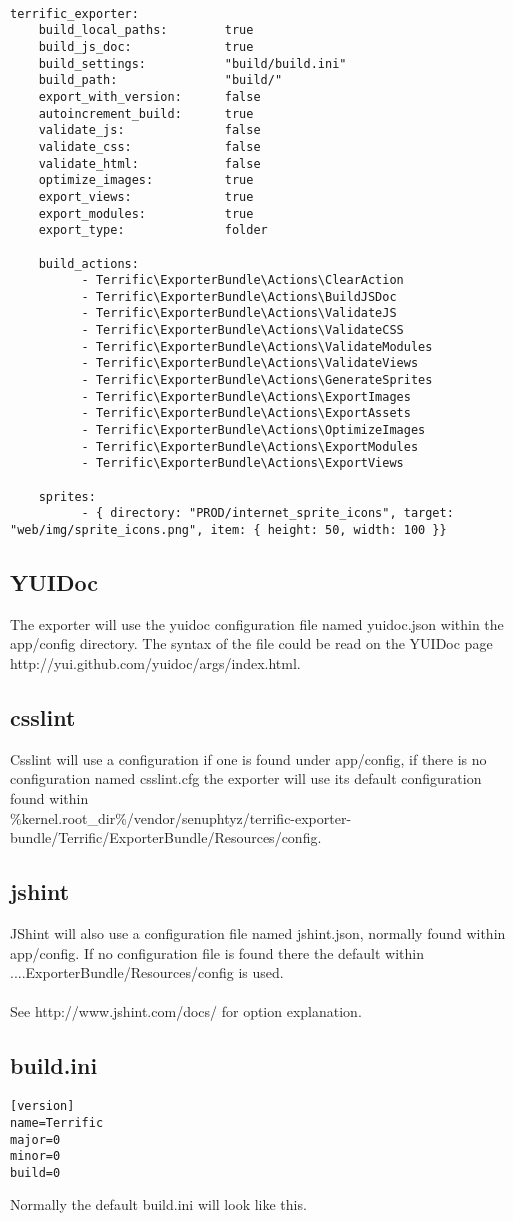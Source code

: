 \begin{verbatim}

terrific_exporter:
	build_local_paths:        true
	build_js_doc:             true
	build_settings:           "build/build.ini"
	build_path:               "build/"
	export_with_version:      false
	autoincrement_build:      true
	validate_js:              false
	validate_css:             false
	validate_html:            false
	optimize_images:          true
	export_views:             true
	export_modules:           true
	export_type:              folder

	build_actions:
	      - Terrific\ExporterBundle\Actions\ClearAction
	      - Terrific\ExporterBundle\Actions\BuildJSDoc
	      - Terrific\ExporterBundle\Actions\ValidateJS
	      - Terrific\ExporterBundle\Actions\ValidateCSS
	      - Terrific\ExporterBundle\Actions\ValidateModules
	      - Terrific\ExporterBundle\Actions\ValidateViews
	      - Terrific\ExporterBundle\Actions\GenerateSprites
	      - Terrific\ExporterBundle\Actions\ExportImages
	      - Terrific\ExporterBundle\Actions\ExportAssets
	      - Terrific\ExporterBundle\Actions\OptimizeImages
	      - Terrific\ExporterBundle\Actions\ExportModules
	      - Terrific\ExporterBundle\Actions\ExportViews

	sprites:
	      - { directory: "PROD/internet_sprite_icons", target: "web/img/sprite_icons.png", item: { height: 50, width: 100 }}

\end{verbatim}

\subsection{YUIDoc}
The exporter will use the yuidoc configuration file named yuidoc.json within the app/config directory. The syntax of the file could be read on the YUIDoc page http://yui.github.com/yuidoc/args/index.html.

\subsection{csslint}
Csslint will use a configuration if one is found under app/config, if there is no configuration named csslint.cfg the exporter will use its default configuration found within \\
\%kernel.root\_dir\%/vendor/senuphtyz/terrific-exporter-bundle/Terrific/ExporterBundle/Resources/config. \\

\subsection{jshint}
JShint will also use a configuration file named jshint.json, normally found within app/config. If no configuration file is found there the default within ....ExporterBundle/Resources/config is used.\\
\\
See http://www.jshint.com/docs/ for option explanation.\\

\subsection{build.ini}

\begin{verbatim}
[version]
name=Terrific
major=0
minor=0
build=0
\end{verbatim}
\noindent Normally the default build.ini will look like this.